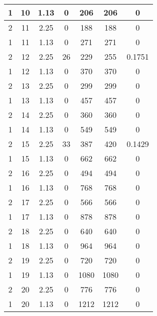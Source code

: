 \documentclass[letterpaper, 12pt]{article}
\begin{document}
\begin{longtable}{|c|c|c|c|c|c|c|}
\hline
1 & 10 & 1.13 & 0 & 206 & 206 & 0 \\
\hline
2 & 11 & 2.25 & 0 & 188 & 188 & 0 \\
\hline
1 & 11 & 1.13 & 0 & 271 & 271 & 0 \\
\hline
2 & 12 & 2.25 & 26 & 229 & 255 & 0.1751 \\
\hline
1 & 12 & 1.13 & 0 & 370 & 370 & 0 \\
\hline
2 & 13 & 2.25 & 0 & 299 & 299 & 0 \\
\hline
1 & 13 & 1.13 & 0 & 457 & 457 & 0 \\
\hline
2 & 14 & 2.25 & 0 & 360 & 360 & 0 \\
\hline
1 & 14 & 1.13 & 0 & 549 & 549 & 0 \\
\hline
2 & 15 & 2.25 & 33 & 387 & 420 & 0.1429 \\
\hline
1 & 15 & 1.13 & 0 & 662 & 662 & 0 \\
\hline
2 & 16 & 2.25 & 0 & 494 & 494 & 0 \\
\hline
1 & 16 & 1.13 & 0 & 768 & 768 & 0 \\
\hline
2 & 17 & 2.25 & 0 & 566 & 566 & 0 \\
\hline
1 & 17 & 1.13 & 0 & 878 & 878 & 0 \\
\hline
2 & 18 & 2.25 & 0 & 640 & 640 & 0 \\
\hline
1 & 18 & 1.13 & 0 & 964 & 964 & 0 \\
\hline
2 & 19 & 2.25 & 0 & 720 & 720 & 0 \\
\hline
1 & 19 & 1.13 & 0 & 1080 & 1080 & 0 \\
\hline
2 & 20 & 2.25 & 0 & 776 & 776 & 0 \\
\hline
1 & 20 & 1.13 & 0 & 1212 & 1212 & 0 \\
\hline
\end{longtable}
\end{document}
